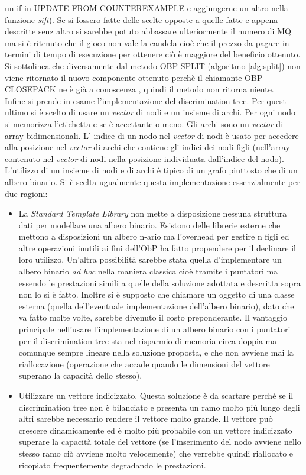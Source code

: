 un if  in UPDATE-FROM-COUNTEREXAMPLE e aggiungerne un altro nella funzione \textit{sift}). Se si fossero fatte delle scelte opposte a quelle fatte e appena descritte senz altro si sarebbe potuto abbassare ulteriormente il numero di \ac{MQ} ma si è ritenuto che il gioco non vale la candela cioè che il prezzo da pagare in termini di tempo di esecuzione per ottenere ciò è maggiore del beneficio ottenuto.\\
Si sottolinea che diversamente dal metodo OBP-SPLIT (algoritmo \ref{alg:split}) non viene ritornato il nuovo componente ottenuto perchè il chiamante OBP-CLOSEPACK ne è già a conoscenza , quindi il metodo non ritorna niente.\\
Infine si prende in esame l'implementazione del discrimination tree. Per quest ultimo si è scelto di usare un \textit{vector} di nodi e un insieme di archi. Per ogni nodo si memorizza l'etichetta e se è accettante o meno. Gli archi sono un \textit{vector} di array bidimensionali. L' indice di un nodo nel \textit{vector} di nodi è usato per accedere alla posizione nel \textit{vector} di archi che contiene gli indici dei nodi figli (nell'array contenuto nel \textit{vector} di nodi nella posizione individuata dall'indice del nodo). L'utilizzo di un insieme di nodi e di archi è tipico di un grafo piuttosto che di un albero binario. Si è scelta ugualmente questa implementazione essenzialmente per due ragioni:
\begin{itemize}
\item La \textit{Standard Template Library} non mette a disposizione nessuna struttura dati per modellare una albero binario. Esistono delle librerie esterne che mettono a disposizioni un albero n-ario ma l'overhead per gestire n figli ed altre operazioni inutili ai fini dell'\ac{ObP} ha fatto propendere per il declinare il loro utilizzo. Un'altra possibilità sarebbe stata quella d'implementare un albero binario \textit{ad hoc} nella maniera classica cioè tramite i puntatori ma essendo le prestazioni simili a quelle della soluzione adottata e descritta sopra non lo si è fatto. Inoltre si è supposto che chiamare un oggetto di una classe esterna (quella dell'eventuale implementazione dell'albero binario), dato che va fatto molte volte, sarebbe divenuto il costo preponderante. Il vantaggio principale nell'usare l'implementazione di un albero binario con i puntatori per il discrimination tree sta nel risparmio di memoria circa doppia ma comunque sempre lineare nella soluzione proposta, e che non avviene mai la riallocazione (operazione che accade quando le dimensioni del vettore superano la capacità dello stesso).
\item Utilizzare un vettore indicizzato. Questa soluzione è da scartare perchè se il discrimination tree non è bilanciato e presenta un ramo molto più lungo degli altri sarebbe necessario rendere il vettore molto grande. Il vettore può crescere dinamicamente ed è molto più probabile con un vettore indicizzato superare la capacità totale del vettore (se l'inserimento del nodo avviene nello stesso ramo ciò avviene molto velocemente) che verrebbe quindi riallocato e ricopiato frequentemente degradando le prestazioni.
\end{itemize} 
  